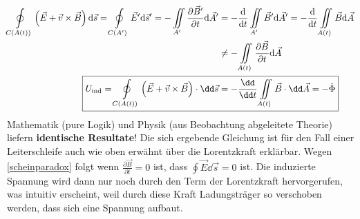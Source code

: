 			        \begin{equation}\begin{split}
			        \oint\limits_{C( A(t))}\left(\vec{E}+\vec{v}\times\vec{B}\right)\mathrm{d} \vec{s}=	\oint\limits_{C (A')}\vec{E}'\mathrm{d} \vec{s}'=-\iint\limits_{A'} \frac{\partial \vec{B}'}{\partial t}\mathrm{d} \vec{A}'&=-\frac{\mathrm{d}}{\mathrm{d} t}\iint\limits_{A'} \vec{B}'\mathrm{d} \vec{A}'=-\frac{\mathrm{d}}{\mathrm{d} t}\iint\limits_{A(t)} \vec{B}\mathrm{d} \vec{A} \\
			        		&\neq -\iint\limits_{A(t)} \frac{\partial \vec{B}}{\partial t}\mathrm{d} \vec{A}\\
					        \Aboxed{U_\text{ind} = \oint\displaylimits_{C(A(t))} \left( \vec{E} + \vec{v} \times \vec{B} \right) \cdot\dd\vec{s} &= - \frac{\dd}{\dd t}  \iint\limits_{A(t)} \vec{B}  \cdot \dd\vec{A}  = -\dot{\Phi}}
				        \end{split}\end{equation}
			 Mathematik (pure Logik) und Physik (aus Beobachtung abgeleitete Theorie) liefern \textbf{identische Resultate}! Die sich ergebende Gleichung ist für den Fall einer Leiterschleife auch wie oben erwähnt über die Lorentzkraft erklärbar. Wegen \ref{scheinparadox} folgt wenn $\frac{\partial \vec{B}}{\partial t}=0$ ist, dass $\oint \vec{E}\dd \vec{s}=0$ ist. Die induzierte Spannung wird dann nur noch durch den Term der Lorentzkraft hervorgerufen, was intuitiv erscheint, weil durch diese Kraft Ladungsträger so verschoben werden, dass sich eine Spannung aufbaut.
		  